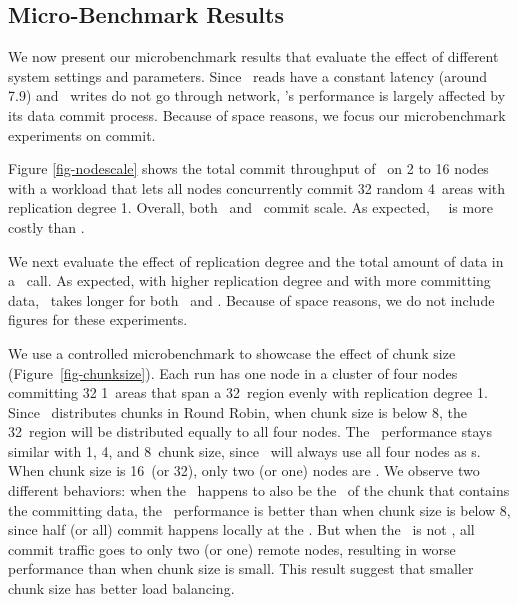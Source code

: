 

\subsection{Micro-Benchmark Results}
\label{sec:hotpot:results}

We now present our microbenchmark results that evaluate the effect of different system settings and parameters.
Since \hotpot\ reads have a constant latency (around 7.9\us) and \hotpot\ writes do not go through network,
\hotpot's performance is largely affected by its data commit process.
Because of space reasons, we focus our microbenchmark experiments on commit.

Figure \ref{fig-nodescale} shows the total commit throughput of \hotpot\ on 2 to 16 nodes with a workload 
that lets all nodes concurrently commit 32 random 4\KB\ areas with replication degree 1. 
Overall, both \mrmw\ and \mrsw\ commit scale.
As expected, \mrmw\ \commitxact\ is more costly than \mrsw. 

We next evaluate the effect of replication degree and the total amount of data in a \commitxact\ call.
As expected, with higher replication degree and with more committing data, \commitxact\ takes longer for both \mrmw\ and \mrsw.
Because of space reasons, we do not include figures for these experiments.

We use a controlled microbenchmark to showcase the effect of chunk size (Figure~\ref{fig-chunksize}).
Each run has one node in a cluster of four nodes committing 32 1\KB\ areas that span a 32\MB\ region evenly with replication degree 1.
Since \hotpot\ distributes chunks in Round Robin, 
when chunk size is below 8\MB, the 32\MB\ region will be distributed equally to all four nodes.
The \commitxact\ performance stays similar with 1, 4, and 8\MB\ chunk size,
since \commitxact\ will always use all four nodes as \on{}s.
When chunk size is 16\MB\ (or 32\MB), only two (or one) nodes are \on.
We observe two different behaviors:
when the \xn\ happens to also be the \on\ of the chunk that contains the committing data,
the \commitxact\ performance is better than when chunk size is below 8\MB, since half (or all) commit happens locally at the \xn.
But when the \xn\ is not \on, all commit traffic goes to only two (or one) remote nodes,
resulting in worse performance than when chunk size is small.
This result suggest that smaller chunk size has better load balancing.

